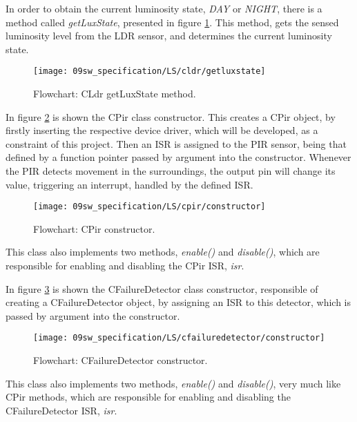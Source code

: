 \clearpage
In order to obtain the current luminosity state, \textit{DAY} or \textit{NIGHT}, there is a method called \textit{getLuxState}, presented in figure \ref{fig:CLdrgetLuxState}. This method, gets the sensed luminosity level from the LDR sensor, and determines the current luminosity state.

\begin{figure}[H]
	\centering
	\texttt{[image: 09sw\_specification/LS/cldr/getluxstate]}
	\caption{Flowchart: CLdr getLuxState method.}
	\label{fig:CLdrgetLuxState}
\end{figure}

\clearpage
{}

In figure \ref{fig:CPirconstructor} is shown the CPir class constructor. This creates a CPir object, by firstly inserting the respective device driver, which will be developed, as a constraint of this project. Then an ISR is assigned to the PIR sensor, being that defined by a function pointer passed by argument into the constructor. Whenever the PIR detects movement in the surroundings, the output pin will change its value, triggering an interrupt, handled by the defined ISR.

\begin{figure}[H]
	\centering
	\texttt{[image: 09sw\_specification/LS/cpir/constructor]}
	\caption{Flowchart: CPir constructor.}
	\label{fig:CPirconstructor}
\end{figure}

This class also implements two methods, \textit{enable()} and \textit{disable()}, which are responsible for enabling and disabling the CPir ISR, \textit{isr}.

\clearpage
{}

In figure \ref{fig:CFailureDetectorConstr} is shown the CFailureDetector class constructor, responsible of creating a CFailureDetector object, by assigning an ISR to this detector, which is passed by argument into the constructor.

\begin{figure}[H]
	\centering
	\texttt{[image: 09sw\_specification/LS/cfailuredetector/constructor]}
	\caption{Flowchart: CFailureDetector constructor.}
	\label{fig:CFailureDetectorConstr}
\end{figure}

This class also implements two methods, \textit{enable()} and \textit{disable()}, very much like CPir methods, which are responsible for enabling and disabling the CFailureDetector ISR, \textit{isr}.
